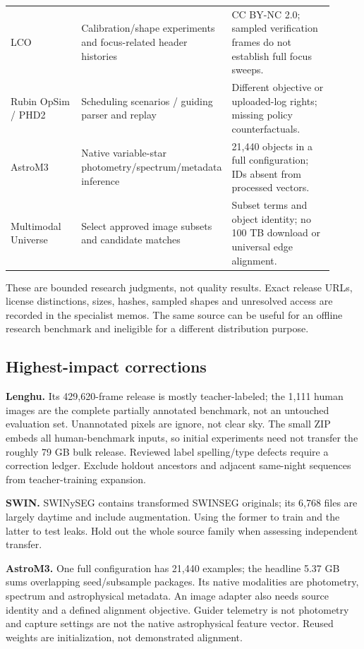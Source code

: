 \documentclass[11pt,a4paper]{article}
\begin{document}
\begin{longtable}{@{}L{0.22\linewidth}L{0.37\linewidth}L{0.32\linewidth}@{}}
LCO & Calibration/shape experiments and focus-related header histories &
CC BY-NC 2.0; sampled verification frames do not establish full focus sweeps.\\
Rubin OpSim / PHD2 & Scheduling scenarios / guiding parser and replay &
Different objective or uploaded-log rights; missing policy counterfactuals.\\
AstroM3 & Native variable-star photometry/spectrum/metadata inference &
21,440 objects in a full configuration; IDs absent from processed vectors.\\
Multimodal Universe & Select approved image subsets and candidate matches &
Subset terms and object identity; no 100 TB download or universal edge alignment.\\
\bottomrule
\end{longtable}

These are bounded research judgments, not quality results. Exact release URLs,
license distinctions, sizes, hashes, sampled shapes and unresolved access are
recorded in the specialist memos. The same source can be useful for an offline
research benchmark and ineligible for a different distribution purpose.

\subsection{Highest-impact corrections}
\textbf{Lenghu.} Its 429,620-frame release is mostly teacher-labeled; the
1,111 human images are the complete partially annotated benchmark, not an
untouched evaluation set. Unannotated pixels are ignore, not clear sky. The
small ZIP embeds all human-benchmark inputs, so initial experiments need not
transfer the roughly 79 GB bulk release. Reviewed label spelling/type defects
require a correction ledger. Exclude holdout ancestors and adjacent same-night
sequences from teacher-training expansion.\cite{lenghu,lenghurelease}

\textbf{SWIN.} SWINySEG contains transformed SWINSEG originals; its 6,768
files are largely daytime and include augmentation. Using the former to train
and the latter to test leaks. Hold out the whole source family when assessing
independent transfer.\cite{swin}

\textbf{AstroM3.} One full configuration has 21,440 examples; the headline
5.37 GB sums overlapping seed/subsample packages. Its native modalities are
photometry, spectrum and astrophysical metadata. An image adapter also needs
source identity and a defined alignment objective. Guider telemetry is not
photometry and capture settings are not the native astrophysical feature
vector. Reused weights are initialization, not demonstrated alignment.\cite{astrompublic}
\end{document}
